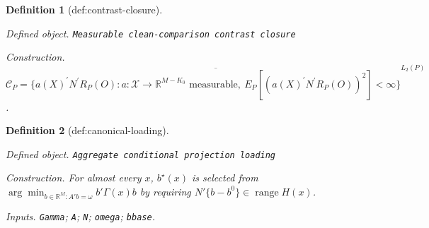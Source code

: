 \documentclass{article}
\newtheorem{definition}{Definition}
\begin{document}
\begin{definition}[def:contrast-closure]\label{def:contrast-closure}
\par\smallskip\noindent\emph{Defined object.} \texttt{Measurable clean-\allowbreak{}comparison contrast closure}
\par\smallskip\noindent\emph{Construction.} \(\mathcal C_P=\overline{\{a(X)^{\prime}N^{\prime}R_P(O):a:\mathcal X\to\mathbb R^{M-K_0}\text{ measurable},\ E_P[(a(X)^{\prime}N^{\prime}R_P(O))^2]<\infty\}}^{L_2(P)}\).
\end{definition}

\begin{definition}[def:canonical-loading]\label{def:canonical-loading}
\par\smallskip\noindent\emph{Defined object.} \texttt{Aggregate conditional projection loading}
\par\smallskip\noindent\emph{Construction.} For almost every \(x\), \(b^{\star}(x)\) is selected from \(\arg\min_{b\in\mathbb R^M:A'b=\omega}b'\Gamma(x)b\) by requiring \(N'\{b-b^0\}\in\operatorname{range}H(x)\).
\par\smallskip\noindent\emph{Inputs.} \texttt{Gamma}; \texttt{A}; \texttt{N}; \texttt{omega}; \texttt{bbase}.
\end{definition}
\end{document}
